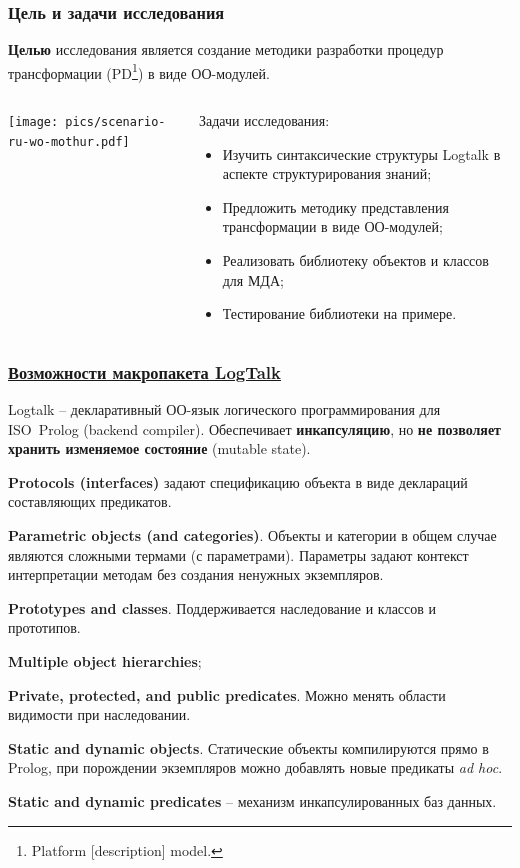 \documentclass[10pt]{beamer}
\begin{document}
\begin{frame}
  \frametitle{Цель и задачи исследования}
  \begin{block}{}
    \textbf{Целью} исследования является создание методики разработки процедур трансформации (PD\footnote{Platform [description] model.}) в виде ОО-модулей.
  \end{block}
  \begin{columns}
    \begin{column}{0.5\linewidth}
      \texttt{[image: pics/scenario-ru-wo-mothur.pdf]}
    \end{column}
    \begin{column}{0.6\linewidth}
      Задачи исследования:
      \begin{itemize}
      \item Изучить синтаксические структуры Logtalk в аспекте структурирования знаний;
      \item Предложить методику представления трансформации в виде ОО-модулей;
      \item Реализовать библиотеку объектов и классов для МДА;
      \item Тестирование библиотеки на примере.
      \end{itemize}
    \end{column}
  \end{columns}
\end{frame}

\begin{frame}
  \frametitle{\href{https://logtalk.org/features.html}{Возможности макропакета LogTalk}}
  Logtalk -- декларативный ОО-язык логического программирования для ISO~Prolog (backend compiler). Обеспечивает \textbf{инкапсуляцию}, но \textbf{не позволяет хранить изменяемое состояние} (mutable state).

  \textbf{Protocols (interfaces)} задают спецификацию объекта в виде деклараций составляющих предикатов.

  \textbf{Parametric objects (and categories)}. Объекты и категории в общем случае являются сложными термами (с параметрами). Параметры задают контекст интерпретации методам без создания ненужных экземпляров.

\textbf{Prototypes and classes}. Поддерживается наследование и классов и прототипов.


\textbf{Multiple object hierarchies};

\textbf{Private, protected, and public predicates}. Можно менять области видимости при наследовании.


\textbf{Static and dynamic objects}. Статические объекты компилируются прямо в Prolog, при порождении экземпляров можно добавлять новые предикаты \emph{ad hoc}.


\textbf{Static and dynamic predicates} -- механизм инкапсулированных баз данных.
\end{frame}
\end{document}

